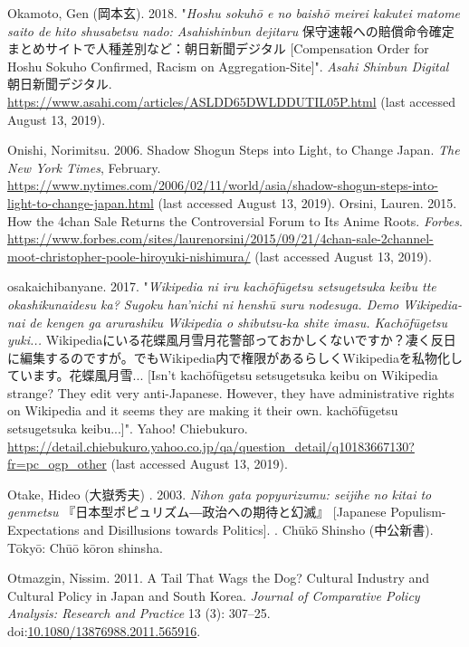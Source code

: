 \documentclass[10pt,british,A4paper,twoside]{memoir}
\begin{document}
\hypertarget{ref-okamoto_eng:_2018}{}
Okamoto, Gen (岡本玄). 2018. "\emph{Hoshu sokuhō e no baishō meirei kakutei matome saito de hito shusabetsu nado: Asahishinbun dejitaru} 保守速報への賠償命令確定 まとめサイトで人種差別など：朝日新聞デジタル [Compensation Order for Hoshu Sokuho Confirmed, Racism on Aggregation-Site]". \emph{Asahi Shinbun Digital} 朝日新聞デジタル.
\url{https://www.asahi.com/articles/ASLDD65DWLDDUTIL05P.html} (last accessed August 13, 2019).

\hypertarget{ref-onishi_shadow_2006}{}
Onishi, Norimitsu. 2006. Shadow Shogun Steps into Light, to Change
Japan. \emph{The New York Times}, February.
\url{https://www.nytimes.com/2006/02/11/world/asia/shadow-shogun-steps-into-light-to-change-japan.html} (last accessed August 13, 2019).
\hypertarget{ref-orsini_how_2015}{}
Orsini, Lauren. 2015. How the 4chan Sale Returns the Controversial Forum
to Its Anime Roots. \emph{Forbes}.
\url{https://www.forbes.com/sites/laurenorsini/2015/09/21/4chan-sale-2channel-moot-christopher-poole-hiroyuki-nishimura/} (last accessed August 13, 2019).

\hypertarget{ref-osakaichibanyane_isnt_2017}{}
osakaichibanyane. 2017. "\emph{Wikipedia ni iru kachōfūgetsu setsugetsuka keibu tte okashikunaidesu ka? Sugoku han'nichi ni henshū suru nodesuga. Demo Wikipedia-nai de kengen ga arurashiku Wikipedia o shibutsu-ka shite imasu. Kachōfūgetsu yuki...} Wikipediaにいる花蝶風月雪月花警部っておかしくないですか？凄く反日に編集するのですが。でもWikipedia内で権限があるらしくWikipediaを私物化しています。花蝶風月雪... [Isn't kachōfūgetsu setsugetsuka keibu on Wikipedia strange? They edit very anti-Japanese. However, they have administrative rights on Wikipedia and it seems they are making it their own. kachōfūgetsu setsugetsuka keibu...]". Yahoo! Chiebukuro. \url{https://detail.chiebukuro.yahoo.co.jp/qa/question_detail/q10183667130?fr=pc_ogp_other} (last accessed August 13, 2019).

\hypertarget{ref-otake__2003}{}
Otake, Hideo (大嶽秀夫) . 2003. \emph{Nihon gata popyurizumu: seijihe no kitai to genmetsu} 『日本型ポピュリズム―政治への期待と幻滅』 [Japanese Populism-Expectations and Disillusions towards Politics].
. Chūkō Shinsho (中公新書). Tōkyō: Chūō kōron shinsha.

\hypertarget{ref-otmazgin_tail_2011}{}
Otmazgin, Nissim. 2011. A Tail That Wags the Dog? Cultural Industry and
Cultural Policy in Japan and South Korea. \emph{Journal of Comparative
Policy Analysis: Research and Practice} 13 (3): 307--25.
doi:\href{https://doi.org/10.1080/13876988.2011.565916}{10.1080/13876988.2011.565916}.
\end{document}
